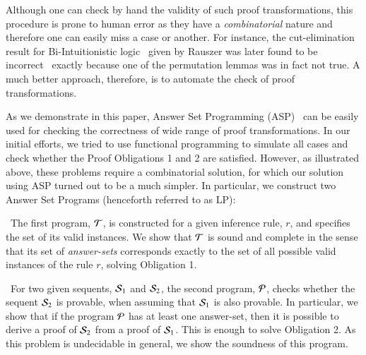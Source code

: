 \documentclass{new_tlp}
\begin{document}
Although one can check by hand the validity of such proof transformations,
this procedure is prone to human error as they have a \emph{combinatorial} nature and 
therefore one can easily miss a case or another. For instance, the cut-elimination 
result for Bi-Intuitionistic logic~\cite{rauszer74studia} given by Rauszer was later found to 
be incorrect~\cite{crolard01tcs} exactly because one of the permutation lemmas was in fact
not true. A much better approach, therefore, is to automate the check of proof
transformations. 

As we demonstrate in this paper, Answer Set Programming
(ASP)~\cite{gelfond90iclp} can be easily used
for checking the correctness of wide range of proof transformations. In our initial efforts, 
we tried to use functional programming to simulate all cases and check
whether the Proof Obligations 1 and 2 are satisfied. However, as illustrated
above, these problems require a combinatorial solution, for which our solution
using ASP turned out to be a much simpler. In particular, we construct two
Answer Set Programs (henceforth referred to as LP):

\noindent
\textbullet~The first program, $\Tscr$, is constructed for a given inference
rule, $r$, and specifies the set of its valid instances. 
We show that $\Tscr$ is sound and complete in the sense
that its set of \emph{answer-sets} corresponds 
exactly to the set of all possible valid instances of the rule $r$, 
solving Obligation 1.

\smallskip

\noindent
\textbullet~For two given sequents, $\Sscr_1$ and $\Sscr_2$, the
second program, $\Pscr$, checks whether the sequent $\Sscr_2$ is provable,
when assuming that $\Sscr_1$ is also provable. In particular, we show that
if the program $\Pscr$ has at least one answer-set, then it is
possible to derive a proof of $\Sscr_2$ from a proof of $\Sscr_1$. This is enough to
solve Obligation 2. As this problem is undecidable in general, we show the soundness
of this program.
\end{document}
